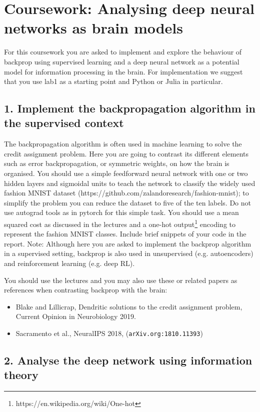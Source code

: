 \documentclass[12pt]{article}
\begin{document}
\section*{Coursework: Analysing deep neural networks as brain models}

For this coursework you are asked to implement and explore the
behaviour of backprop using supervised learning and a deep neural
network as a potential model for information processing in the
brain. For implementation we suggest that you use lab1 as a starting
point and Python or Julia in particular.

\subsection*{1. Implement the backpropagation algorithm in the supervised context}

The backpropagation algorithm is often used in machine learning to
solve the credit assignment problem. Here you are going to contrast
its different elements such as error backpropagation, or symmetric
weights, on how the brain is organised. You should use a simple
feedforward neural network with one or two hidden layers and sigmoidal
units to teach the network to classify the widely used fashion MNIST
dataset (https://github.com/zalandoresearch/fashion-mnist); to
simplify the problem you can reduce the dataset to five of the ten
labels. Do not use autograd tools as in pytorch for this simple
task. You should use a mean squared cost as discussed in the lectures
and a one-hot output\footnote{https://en.wikipedia.org/wiki/One-hot}
encoding to represent the fashion MNIST classes.  Include brief
snippets of your code in the report. Note: Although here you are asked
to implement the backprop algorithm in a supervised setting, backprop
is also used in unsupervised (e.g. autoencoders) and reinforcement
learning (e.g. deep RL).

You should use the lectures and you may also use these or related
papers as references when contrasting backprop with the brain:

\begin{itemize}
\item Blake and Lillicrap, Dendritic solutions to the credit
  assignment problem, Current Opinion in Neurobiology 2019.
\item Sacramento et al., NeuralIPS 2018,
  (\texttt{arXiv.org:1810.11393})
\end{itemize}
 
\subsection*{2. Analyse the deep network using information theory}
\end{document}
